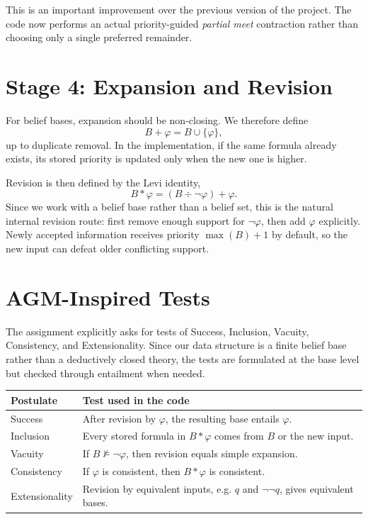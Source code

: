 \documentclass[11pt,a4paper]{article}
\begin{document}
This is an important improvement over the previous version of the project. The code now performs an actual priority-guided \emph{partial meet} contraction rather than choosing only a single preferred remainder.

\section{Stage 4: Expansion and Revision}
For belief bases, expansion should be non-closing. We therefore define
\[
B + \varphi = B \cup \{\varphi\},
\]
up to duplicate removal. In the implementation, if the same formula already exists, its stored priority is updated only when the new one is higher.

Revision is then defined by the Levi identity,
\[
B * \varphi = (B \div \neg \varphi) + \varphi.
\]
Since we work with a belief base rather than a belief set, this is the natural internal revision route: first remove enough support for \(\neg \varphi\), then add \(\varphi\) explicitly. Newly accepted information receives priority \(\max(B)+1\) by default, so the new input can defeat older conflicting support.

\section{AGM-Inspired Tests}
The assignment explicitly asks for tests of Success, Inclusion, Vacuity, Consistency, and Extensionality. Since our data structure is a finite belief base rather than a deductively closed theory, the tests are formulated at the base level but checked through entailment when needed.

\begin{center}
\small
\begin{tabular}{>{\raggedright\arraybackslash}p{2.7cm} p{8.9cm}}
\toprule
\textbf{Postulate} & \textbf{Test used in the code} \\
\midrule
Success & After revision by \(\varphi\), the resulting base entails \(\varphi\). \\
Inclusion & Every stored formula in \(B * \varphi\) comes from \(B\) or the new input. \\
Vacuity & If \(B \not\models \neg \varphi\), then revision equals simple expansion. \\
Consistency & If \(\varphi\) is consistent, then \(B * \varphi\) is consistent. \\
Extensionality & Revision by equivalent inputs, e.g. \(q\) and \(\neg\neg q\), gives equivalent bases. \\
\bottomrule
\end{tabular}
\end{center}
\end{document}

